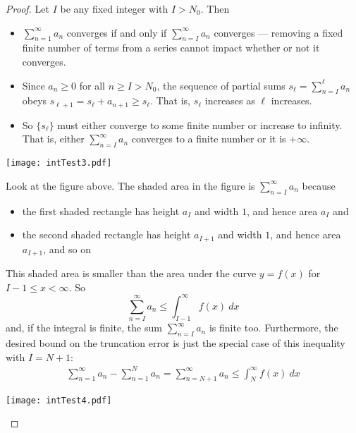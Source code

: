 \begin{proof}
Let $I$ be any fixed integer with $I>N_0$. Then
\begin{itemize}
\item
$\sum_{n=1}^\infty a_n$ converges if and only if
$\sum_{n=I}^\infty a_n$ converges --- removing a fixed finite number
of terms from a series cannot impact whether or not it converges.
\item
Since $a_n\ge 0$ for all $n\ge I>N_0$, the sequence of partial sums
$s_\ell=\sum_{n=I}^\ell a_n$ obeys $s_{\ell+1} = s_\ell+a_{n+1}
\ge s_\ell$. That is, $s_\ell$ increases as $\ell$ increases.
\item
So $\big\{s_\ell\big\}$ must either
converge to some finite number or increase to infinity. That is, either
$\sum_{n=I}^\infty a_n$ converges to a finite number or it is $+\infty$.
\end{itemize}
\begin{efig}
\begin{center}
     \texttt{[image: intTest3.pdf]}
\end{center}
\end{efig}

Look at the figure above. The shaded area in the figure is
$\sum_{n=I}^\infty a_n$ because
\begin{itemize}\itemsep1pt \parskip0pt  %
\item the first shaded rectangle has height $a_I$
and width $1$, and hence area $a_I$ and
\item the second shaded rectangle has height $a_{I+1}$
and width $1$, and hence area $a_{I+1}$, and so on
\end{itemize}
This shaded area is smaller than the area under the curve $y=f(x)$ for
$I-1\le x<\infty$. So
\begin{equation*}
\sum_{n=I}^\infty a_n
\le \int_{I-1}^\infty f(x)\ dx
\end{equation*}
and, if the integral is finite, the sum $\sum_{n=I}^\infty a_n$ is
finite too.
Furthermore, the desired bound on the truncation error is just
the special case of this inequality with $I=N+1$:
\begin{align*}
\sum_{n=1}^\infty a_n - \sum_{n=1}^N a_n
=\sum_{n=N+1}^\infty a_n
\le \int_N^\infty f(x)\ dx
\end{align*}


\begin{efig}
\begin{center}
     \texttt{[image: intTest4.pdf]}
\end{center}
\end{efig}


\end{proof}
